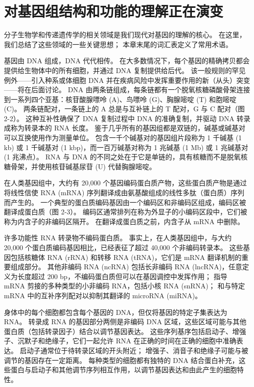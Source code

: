 \section{对基因组结构和功能的理解正在演变}
分子生物学和传递遗传学的相关领域是我们现代对基因的理解的核心。 在这里，我们总结了这些领域的一些关键思想； 本章末尾的词汇表定义了常用术语。

基因由 DNA 组成，DNA 代代相传。 在大多数情况下，每个基因的精确拷贝都会提供给生物体中的所有细胞，并通过 DNA 复制提供给后代。 该一般规则的罕见例外——引入种系或体细胞 DNA 并在疾病风险中发挥重要作用的新（从头）突变——将在后面讨论。 DNA 由两条链组成，每条链都有一个脱氧核糖磷酸骨架连接到一系列四个亚基：核苷酸腺嘌呤 (A)、鸟嘌呤 (G)、胸腺嘧啶 (T) 和胞嘧啶 (C)。 两条链配对，一条链上的 A 总是与互补链上的 T 配对，G 与 C 配对（图 2-2）。 这种互补性确保了 DNA 复制过程中 DNA 的准确复制，并驱动 DNA 转录成称为转录本的 RNA 长度。 鉴于几乎所有的基因组都是双链的，碱基或碱基对可以互换使用作为测量单位。 包含一千个碱基对的基因组片段称为 1 千碱基 (1 kb) 或 1 千碱基对 (1 kbp)，而一百万碱基对称为 1 兆碱基 (1 Mb) 或 1 兆碱基对 (1 兆沸点）。 RNA 与 DNA 的不同之处在于它是单链的，具有核糖而不是脱氧核糖骨架，并使用核苷碱基尿苷 (U) 代替胸腺嘧啶。

在人类基因组中，大约有 20,000 个基因编码蛋白质产物，这些蛋白质产物是通过将线性信使 RNA (mRNA) 序列翻译成由氨基酸组成的线性多肽（蛋白质）序列而产生的。 一个典型的蛋白质编码基因由一个编码区和非编码区组成，编码区被翻译成蛋白质（图 2-3）。 编码区通常排列在称为外显子的小编码区段中，它们被称为内含子的非编码区隔开。 在翻译成蛋白质之前，内含子从 mRNA 中删除。

许多功能性 RNA 转录物不编码蛋白质。 事实上，在人类基因组中，与大约 20,000 个蛋白质编码基因相比，已经表征了超过 40,000 个非编码转录本。 这些基因包括核糖体 RNA (rRNA) 和转移 RNA (tRNA)，它们是 mRNA 翻译机制的重要组成部分。 其他非编码 RNA (ncRNA) 包括长非编码 RNA (lncRNA)，任意定义为长度超过 200 bp，不编码蛋白质但可以在基因调控中发挥作用； 指导 mRNA 剪接的多种类型的小非编码 RNA，包括小核 RNA (snRNA)； 和与特定 mRNA 中的互补序列配对以抑制其翻译的 microRNA (miRNA)。

身体中的每个细胞都包含每个基因的 DNA，但仅将基因的特定子集表达为 RNA。 转录成 RNA 的基因部分两侧是非编码 DNA 区域，这些区域可能与其他蛋白质（包括转录因子）结合以调节基因表达。 这些序列基序包括启动子、增强子、沉默子和绝缘子，它们一起允许 RNA 在正确的时间在正确的细胞中准确表达。 启动子通常位于待转录区域的开头附近； 增强子、消音子和绝缘子可能与被调节的基因存在一定距离。 每种类型的细胞都有独特的 DNA 结合蛋白补充，这些蛋白与启动子和其他调节序列相互作用，以调节基因表达和由此产生的细胞特性。

